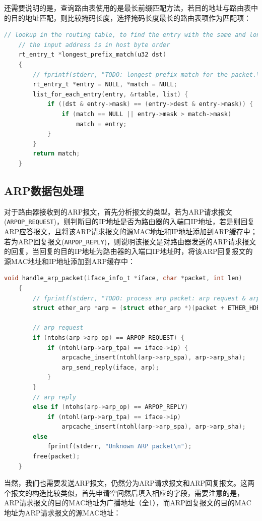 \documentclass[UTF8]{report}
\begin{document}
还需要说明的是，查询路由表使用的是最长前缀匹配方法，若目的地址与路由表中的目的地址匹配，则比较掩码长度，选择掩码长度最长的路由表项作为匹配项：

\begin{lstlisting}[language=C]
    // lookup in the routing table, to find the entry with the same and longest prefix.
    // the input address is in host byte order
    rt_entry_t *longest_prefix_match(u32 dst)
    {
        // fprintf(stderr, "TODO: longest prefix match for the packet.\n");
        rt_entry_t *entry = NULL, *match = NULL;
        list_for_each_entry(entry, &rtable, list) {
            if ((dst & entry->mask) == (entry->dest & entry->mask)) {
                if (match == NULL || entry->mask > match->mask)
                    match = entry;
            }
        }
        return match;
    }
\end{lstlisting}

\subsection{ARP数据包处理}

对于路由器接收到的ARP报文，首先分析报文的类型。若为ARP请求报文(\texttt{ARPOP_REQUEST})，则判断目的IP地址是否为路由器的入端口IP地址，若是则回复ARP应答报文，且将该ARP请求报文的源MAC地址和IP地址添加到ARP缓存中；若为ARP回复报文(\texttt{ARPOP_REPLY})，则说明该报文是对路由器发送的ARP请求报文的回复，当回复的目的IP地址为路由器的入端口IP地址时，将该ARP回复报文的源MAC地址和IP地址添加到ARP缓存中：

\begin{lstlisting}[language=C]
    void handle_arp_packet(iface_info_t *iface, char *packet, int len)
    {
        // fprintf(stderr, "TODO: process arp packet: arp request & arp reply.\n");
        struct ether_arp *arp = (struct ether_arp *)(packet + ETHER_HDR_SIZE);
    
        // arp request
        if (ntohs(arp->arp_op) == ARPOP_REQUEST) {
            if (ntohl(arp->arp_tpa) == iface->ip) {
                arpcache_insert(ntohl(arp->arp_spa), arp->arp_sha);
                arp_send_reply(iface, arp);
            }
        }
        // arp reply
        else if (ntohs(arp->arp_op) == ARPOP_REPLY)
            if (ntohl(arp->arp_tpa) == iface->ip)
                arpcache_insert(ntohl(arp->arp_spa), arp->arp_sha);
        else 
            fprintf(stderr, "Unknown ARP packet\n");
        free(packet);
    }
\end{lstlisting}

当然，我们也需要发送ARP报文，仍然分为ARP请求报文和ARP回复报文。这两个报文的构造比较类似，首先申请空间然后填入相应的字段，需要注意的是，ARP请求报文的目的MAC地址为广播地址（全1），而ARP回复报文的目的MAC地址为ARP请求报文的源MAC地址：
\end{document}
